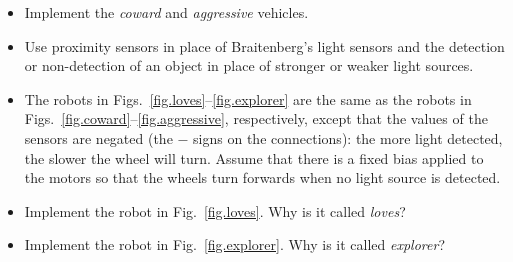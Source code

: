 \begin{framed}
\begin{itemize}
\item Implement the \emph{coward} and \emph{aggressive} vehicles.
\item Use proximity sensors in place of Braitenberg's light sensors and the detection or non-detection of an object in place of stronger or weaker light sources.
\item The robots in Figs.~\ref{fig.loves}--\ref{fig.explorer} are the same as the robots in Figs.~\ref{fig.coward}--\ref{fig.aggressive}, respectively, except that the values of the sensors are negated (the $-$ signs on the connections): the more light detected, the slower the wheel will turn. Assume that there is a fixed bias applied to the motors so that the wheels turn forwards when no light source is detected.
\item Implement the robot in Fig.~\ref{fig.loves}. Why is it called \emph{loves}?
\item Implement the robot in Fig.~\ref{fig.explorer}. Why is it called \emph{explorer}?
\end{itemize}
\end{framed}


